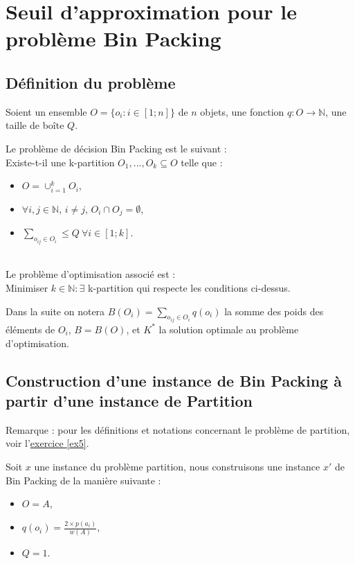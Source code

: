 \section{Seuil d'approximation pour le problème Bin Packing}\label{ex10}

\subsection{Définition du problème}\label{ex10_q1}
Soient un ensemble $O = \{o_i : i \in [1;n]\}$ de $n$ objets, une fonction $q : O \rightarrow \mathbb{N}$, une taille de boîte $Q$.

Le problème de décision Bin Packing est le suivant :\\
Existe-t-il une k-partition $O_1,...,O_k \subseteq O$ telle que :
\begin{itemize}
	\item $O = \cup_{i = 1}^{k}O_i$,
	\item $\forall i,j \in \mathbb{N}$, $i \neq j$, $O_i \cap O_j = \emptyset$,
	\item $\sum_{o_{ij} \in O_i} \leq Q\ \forall i \in [1;k]$.
\end{itemize}
~\\
Le problème d'optimisation associé est :\\
Minimiser $k \in \mathbb{N} : \exists$ k-partition qui respecte les conditions ci-dessus.

Dans la suite on notera $B(O_i) = \sum\limits_{o_{ij} \in O_i}q(o_i)$ la somme des poids des
éléments de $O_i$, $B = B(O)$, et $K^*$ la solution optimale au problème d'optimisation.

\subsection{Construction d'une instance de Bin Packing à partir d'une instance de Partition}\label{ex10_q2}
Remarque : pour les définitions et notations concernant le problème de partition, voir
l'\href{ex5}{exercice \ref{ex5}}.

Soit $x$ une instance du problème partition, nous construisons
une instance $x'$ de Bin Packing de la manière suivante :
\begin{itemize}
	\item $O = A$,
	\item $q(o_i) = \frac{2 \times p(a_i)}{w(A)}$,
	\item $Q = 1$.
\end{itemize}


